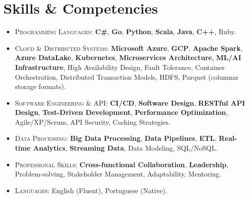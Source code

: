
\section{Skills \& Competencies}

\begin{itemize}
    \item \footnotesize{\textsc{Programming Languages}:}\scriptsize{ \textbf{C\#}, \textbf{Go}, \textbf{Python}, \textbf{Scala}, \textbf{Java}, \textbf{C++}, Ruby.}

    \item \footnotesize{\textsc{Cloud \& Distributed Systems}:}\scriptsize{ \textbf{Microsoft Azure}, \textbf{GCP}, \textbf{Apache Spark}, \textbf{Azure DataLake}, \textbf{Kubernetes}, \textbf{Microservices Architecture}, \textbf{ML/AI Infrastructure}, High Availability Design, Fault Tolerance, Container Orchestration, Distributed Transaction Models, HDFS, Parquet (columnar storage formats).}
    
    \item \footnotesize{\textsc{Software Engineering \& API}:}\scriptsize{ \textbf{CI/CD}, \textbf{Software Design}, \textbf{RESTful API Design}, \textbf{Test-Driven Development}, \textbf{Performance Optimization}, Agile/XP/Scrum, API Security, Caching Strategies.}
    
    \item \footnotesize{\textsc{Data Processing}:}\scriptsize{ \textbf{Big Data Processing}, \textbf{Data Pipelines}, \textbf{ETL}, \textbf{Real-time Analytics}, \textbf{Streaming Data}, Data Modeling, SQL/NoSQL.}
    
    \item \footnotesize{\textsc{Professional Skills}:}\scriptsize{ \textbf{Cross-functional Collaboration}, \textbf{Leadership}, Problem-solving, Stakeholder Management, Adaptability, Mentoring.}
    
    \item \footnotesize{\textsc{Languages}:}\scriptsize{ English (Fluent), Portuguese (Native).}
\end{itemize}